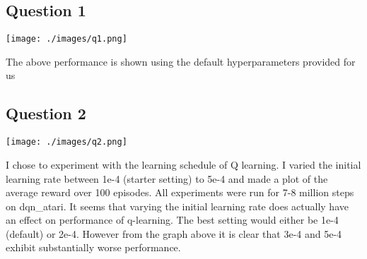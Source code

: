 \documentclass[12pt]{report}
\begin{document}
\subsection*{Question 1}
\begin{center}
\texttt{[image: ./images/q1.png]}
\end{center}
The above performance is shown using the default hyperparameters provided for us
\newpage
\subsection*{Question 2}
\begin{center}
\texttt{[image: ./images/q2.png]}
\end{center}
I chose to experiment with the learning schedule of Q learning. I varied the initial learning rate between 1e-4 (starter setting) to 5e-4 and made a plot of the average reward over 100 episodes. All experiments were run for 7-8 million steps on dqn\_atari. It seems that varying the initial learning rate does actually have an effect on performance of q-learning. The best setting would either be 1e-4 (default) or 2e-4. However from the graph above it is clear that 3e-4 and 5e-4 exhibit substantially worse performance.
\end{document}

